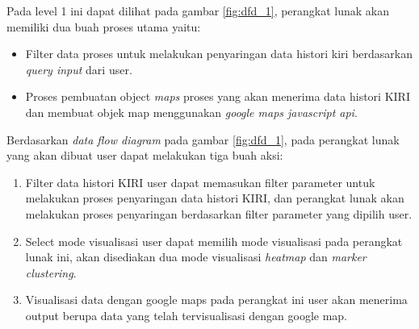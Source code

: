 Pada level 1 ini dapat dilihat pada gambar \ref{fig:dfd_1}, perangkat lunak akan memiliki dua buah proses utama yaitu:
\begin{itemize}
    \item Filter data proses untuk melakukan penyaringan data histori kiri berdasarkan \textit{query input} dari user.
    \item Proses pembuatan object \textit{maps} proses yang akan menerima data histori KIRI dan membuat objek map menggunakan \textit{google maps javascript api}.
\end{itemize}

Berdasarkan \textit{data flow diagram } pada gambar \ref{fig:dfd_1}, pada perangkat lunak yang akan dibuat user dapat melakukan tiga buah aksi:

\begin{enumerate}
  \item Filter data histori KIRI user dapat memasukan filter parameter untuk melakukan proses penyaringan data histori KIRI, dan perangkat lunak akan melakukan proses penyaringan berdasarkan filter parameter yang dipilih user.
  \item Select mode visualisasi user dapat memilih mode visualisasi pada perangkat lunak ini, akan disediakan dua mode visualisasi \textit{heatmap} dan \textit{marker clustering}.
  \item Visualisasi data dengan google maps pada perangkat ini user akan menerima output berupa data yang telah tervisualisasi dengan google map.
\end{enumerate}

